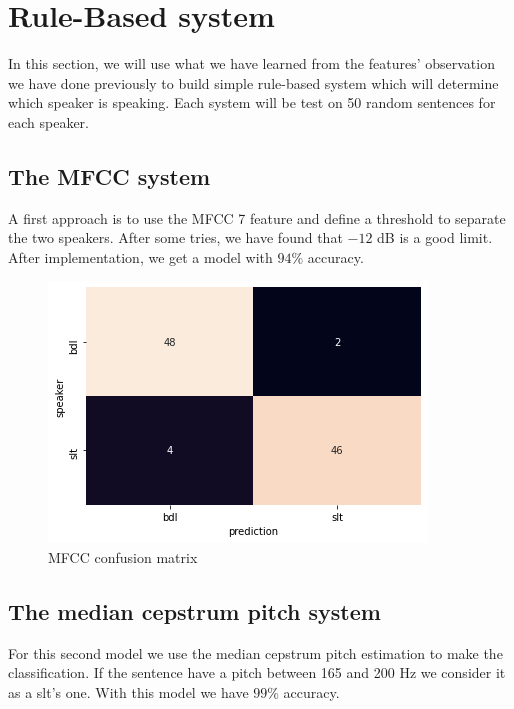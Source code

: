 \documentclass[]{article}
\begin{document}
\section{Rule-Based system}

In this section, we will use what we have learned from the features' observation we have 
done previously to build simple rule-based system which will determine which speaker is
speaking. Each system will be test on 50 random sentences for each speaker.

\subsection{The MFCC system}

A first approach is to use the MFCC 7 feature and define a threshold to separate the two speakers.
After some tries, we have found that $-12$ dB is a good limit. After implementation, we get a model
with $94\%$ accuracy.


\begin{figure}[H]
    \centering
    \caption{\label{confusion1}MFCC confusion matrix}
    \includegraphics[scale=0.5]{images/confusion1.png}
\end{figure}

\subsection{The median cepstrum pitch system}

For this second model we use the median cepstrum pitch estimation to make the classification.
If the sentence have a pitch between 165 and 200 Hz we consider it as a  slt's one.
With this model we have $99\%$ accuracy.
\end{document}
